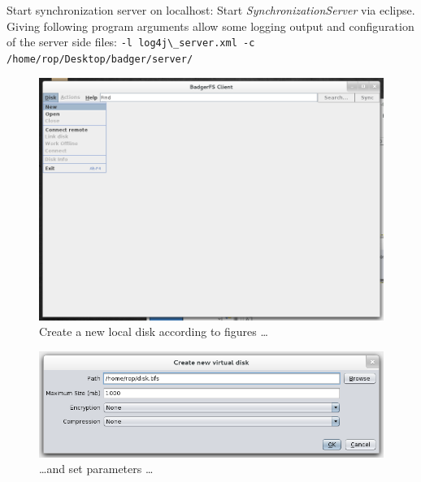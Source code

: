 Start synchronization server on localhost: Start
\textit{SynchronizationServer} via eclipse. Giving following program arguments
allow some logging output and configuration of the server side files:\newline 
\verb|-l log4j\_server.xml -c /home/rop/Desktop/badger/server/|



\begin{figure}[h!]
\centering
\includegraphics[width=1\textwidth]{figures/serverUseCase/01_newDisk.png}
\caption{Create a new local disk according to figures \ldots}
\label{fig:01_newDisk.png}
\end{figure}

\begin{figure}[h!]
\centering
\includegraphics[width=1\textwidth]{figures/serverUseCase/02_newDisk2.png}
\caption{\ldots and set parameters \ldots}
\label{fig:02_newDisk2.png}
\end{figure}

